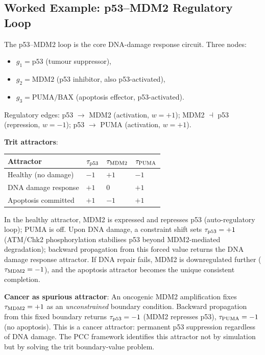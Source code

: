 \subsection{Worked Example: p53--MDM2 Regulatory Loop}

\begin{example}
\label{ex:ch05-p53}
The p53--MDM2 loop is the core DNA-damage response circuit.  Three nodes:
\begin{itemize}
    \item $g_1 = \text{p53}$ (tumour suppressor),
    \item $g_2 = \text{MDM2}$ (p53 inhibitor, also p53-activated),
    \item $g_3 = \text{PUMA/BAX}$ (apoptosis effector, p53-activated).
\end{itemize}
Regulatory edges: p53 $\to$ MDM2 (activation, $w = +1$); MDM2 $\dashv$
p53 (repression, $w = -1$); p53 $\to$ PUMA (activation, $w = +1$).

\medskip
\textbf{Trit attractors}:

\begin{center}
\begin{tabular}{llll}
\toprule
\textbf{Attractor} & $\tau_{\mathrm{p53}}$ & $\tau_{\mathrm{MDM2}}$ &
    $\tau_{\mathrm{PUMA}}$ \\
\midrule
Healthy (no damage) & $-1$ & $+1$ & $-1$ \\
DNA damage response & $+1$ & $0$  & $+1$ \\
Apoptosis committed & $+1$ & $-1$ & $+1$ \\
\bottomrule
\end{tabular}
\end{center}

In the healthy attractor, MDM2 is expressed and represses p53 (auto-regulatory
loop); PUMA is off.  Upon DNA damage, a constraint shift sets
$\tau_{\mathrm{p53}} = +1$ (ATM/Chk2 phosphorylation stabilises p53
beyond MDM2-mediated degradation); backward propagation from this forced
value returns the DNA damage response attractor.  If DNA repair fails,
MDM2 is downregulated further ($\tau_{\mathrm{MDM2}} = -1$), and the
apoptosis attractor becomes the unique consistent completion.

\medskip
\textbf{Cancer as spurious attractor}: An oncogenic MDM2 amplification
fixes $\tau_{\mathrm{MDM2}} = +1$ as an \emph{unconstrained} boundary
condition.  Backward propagation from this fixed boundary returns
$\tau_{\mathrm{p53}} = -1$ (MDM2 represses p53), $\tau_{\mathrm{PUMA}}
= -1$ (no apoptosis).  This is a cancer attractor: permanent p53 suppression
regardless of DNA damage.  The PCC framework identifies this attractor
not by simulation but by solving the trit boundary-value problem.
\end{example}

